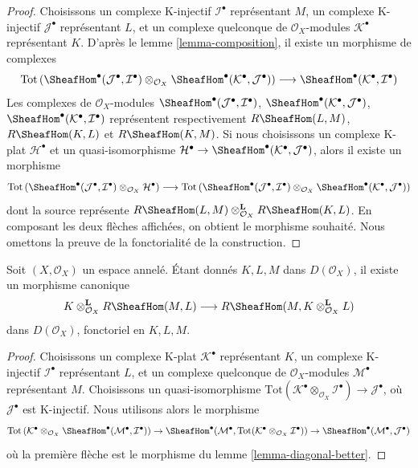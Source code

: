 {\begin{proof}
Choisissons un complexe K-injectif $\mathcal{I}^\bullet$ représentant $M$, un complexe K-injectif $\mathcal{J}^\bullet$ représentant $L$, et un complexe quelconque de $\mathcal{O}_X$-modules $\mathcal{K}^\bullet$ représentant $K$. D'après le lemme \ref{lemma-composition}, il existe un morphisme de complexes
$$
\text{Tot}\left(
\SheafHom^\bullet(\mathcal{J}^\bullet, \mathcal{I}^\bullet)
\otimes_{\mathcal{O}_X}
\SheafHom^\bullet(\mathcal{K}^\bullet, \mathcal{J}^\bullet)
\right)
\longrightarrow
\SheafHom^\bullet(\mathcal{K}^\bullet, \mathcal{I}^\bullet)
$$
Les complexes de $\mathcal{O}_X$-modules
$\SheafHom^\bullet(\mathcal{J}^\bullet, \mathcal{I}^\bullet)$,
$\SheafHom^\bullet(\mathcal{K}^\bullet, \mathcal{J}^\bullet)$,
$\SheafHom^\bullet(\mathcal{K}^\bullet, \mathcal{I}^\bullet)$
représentent respectivement $R\SheafHom(L, M)$, $R\SheafHom(K, L)$ et $R\SheafHom(K, M)$. Si nous choisissons un complexe K-plat $\mathcal{H}^\bullet$ et un quasi-isomorphisme
$\mathcal{H}^\bullet \to
\SheafHom^\bullet(\mathcal{K}^\bullet, \mathcal{J}^\bullet)$, alors il existe un morphisme
$$
\text{Tot}\left(
\SheafHom^\bullet(\mathcal{J}^\bullet, \mathcal{I}^\bullet)
\otimes_{\mathcal{O}_X} \mathcal{H}^\bullet
\right)
\longrightarrow
\text{Tot}\left(
\SheafHom^\bullet(\mathcal{J}^\bullet, \mathcal{I}^\bullet)
\otimes_{\mathcal{O}_X}
\SheafHom^\bullet(\mathcal{K}^\bullet, \mathcal{J}^\bullet)
\right)
$$
dont la source représente
$R\SheafHom(L, M) \otimes_{\mathcal{O}_X}^\mathbf{L} R\SheafHom(K, L)$. En composant les deux flèches affichées, on obtient le morphisme souhaité. Nous omettons la preuve de la fonctorialité de la construction.

\end{proof}

\begin{lemma}

\label{lemma-internal-hom-diagonal-better}
Soit $(X, \mathcal{O}_X)$ un espace annelé. Étant donnés $K, L, M$ dans $D(\mathcal{O}_X)$, il existe un morphisme canonique $$
K \otimes_{\mathcal{O}_X}^\mathbf{L} R\SheafHom(M, L)
\longrightarrow
R\SheafHom(M, K \otimes_{\mathcal{O}_X}^\mathbf{L} L)
$$ dans $D(\mathcal{O}_X)$, fonctoriel en $K, L, M$.
\end{lemma}

\begin{proof}
Choisissons un complexe K-plat $\mathcal{K}^\bullet$ représentant $K$, un complexe K-injectif $\mathcal{I}^\bullet$ représentant $L$, et un complexe quelconque de $\mathcal{O}_X$-modules $\mathcal{M}^\bullet$ représentant $M$. Choisissons un quasi-isomorphisme $\text{Tot}(\mathcal{K}^\bullet \otimes_{\mathcal{O}_X} \mathcal{I}^\bullet)
\to \mathcal{J}^\bullet$, où $\mathcal{J}^\bullet$ est K-injectif. Nous utilisons alors le morphisme $$
\text{Tot}\left(
\mathcal{K}^\bullet \otimes_{\mathcal{O}_X}
\SheafHom^\bullet(\mathcal{M}^\bullet, \mathcal{I}^\bullet)
\right)
\to
\SheafHom^\bullet(\mathcal{M}^\bullet,
\text{Tot}(\mathcal{K}^\bullet \otimes_{\mathcal{O}_X} \mathcal{I}^\bullet))
\to
\SheafHom^\bullet(\mathcal{M}^\bullet, \mathcal{J}^\bullet)
$$ où la première flèche est le morphisme du lemme \ref{lemma-diagonal-better}.
\end{proof}

}
